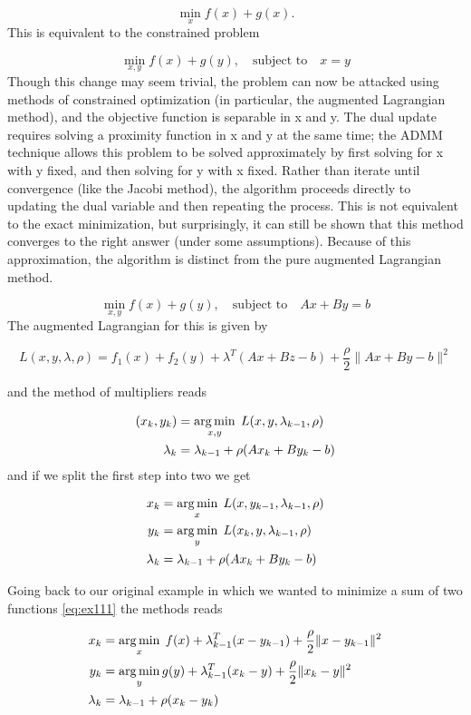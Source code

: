 \begin{equation}\min _{x}f(x)+g(x).\label{eq:ex111}
\end{equation}
This is equivalent to the constrained problem

\[\min _{{x,y}}f(x)+g(y),\quad {\text{subject to}}\quad x=y\]
Though this change may seem trivial, the problem can now be attacked using methods of constrained optimization (in particular, the augmented Lagrangian method), and the objective function is separable in x and y. The dual update requires solving a proximity function in x and y at the same time; the ADMM technique allows this problem to be solved approximately by first solving for x with y fixed, and then solving for y with x fixed. Rather than iterate until convergence (like the Jacobi method), the algorithm proceeds directly to updating the dual variable and then repeating the process. This is not equivalent to the exact minimization, but surprisingly, it can still be shown that this method converges to the right answer (under some assumptions). Because of this approximation, the algorithm is distinct from the pure augmented Lagrangian method.

\[\min _{{x,y}}f(x)+g(y),\quad {\text{subject to}}\quad Ax+By=b\]
The augmented Lagrangian for this is given by

\[L(x,y,\lambda,\rho)=f_1(x)+f_2(y)+\lambda^T(Ax+Bz-b)+\frac{\rho}{2}\|Ax+By-b\|^2\]

and the method of multipliers reads


\begin{align}
(x_k,y_k)&=\operatorname*{arg\,min}_{x,y} \;L(x,y,\lambda_{k-1},\rho)\\
\lambda_k&=\lambda_{k-1}+\rho(Ax_k+By_k-b)
\end{align}
and if we split the first step into two we get

\begin{align}
x_k&=\operatorname*{arg\,min}_{x} \;L(x,y_{k-1},\lambda_{k-1},\rho)\\
y_k&=\operatorname*{arg\,min}_{y} \;L(x_k,y,\lambda_{k-1},\rho)\\
\lambda_k&=\lambda_{k-1}+\rho(Ax_k+By_k-b)
\end{align}

Going back to our original example in which we wanted to minimize a sum of two functions \eqref{eq:ex111} the methods reads

\begin{align}
x_k&=\operatorname*{arg\,min}_{x} \;f(x)+\lambda_{k-1}^T(x-y_{k-1})+\frac{\rho}{2}\|x-y_{k-1}\|^2\\
y_k&=\operatorname*{arg\,min}_{y} g(y)+\lambda_{k-1}^T(x_k-y)+\frac{\rho}{2}\|x_k-y\|^2\\
\lambda_k&=\lambda_{k-1}+\rho(x_k-y_k)
\end{align}

